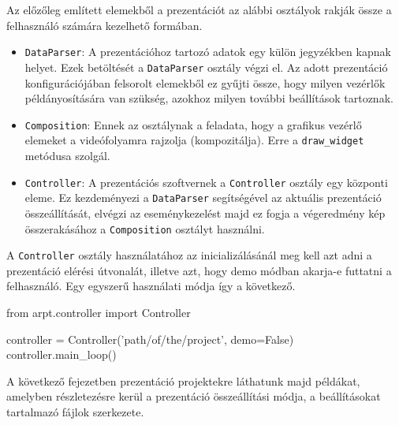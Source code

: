 
Az előzőleg említett elemekből a prezentációt az alábbi osztályok rakják össze a felhasználó számára kezelhető formában.
\begin{itemize}
\item \texttt{DataParser}: A prezentációhoz tartozó adatok egy külön jegyzékben kapnak helyet. Ezek betöltését a \texttt{DataParser} osztály végzi el. Az adott prezentáció konfigurációjában felsorolt elemekből ez gyűjti össze, hogy milyen vezérlők példányosítására van szükség, azokhoz milyen további beállítások tartoznak.
\item \texttt{Composition}: Ennek az osztálynak a feladata, hogy a grafikus vezérlő elemeket a videófolyamra rajzolja (kompozitálja). Erre a \texttt{draw\_widget} metódusa szolgál.
\item \texttt{Controller}: A prezentációs szoftvernek a \texttt{Controller} osztály egy központi eleme. Ez kezdeményezi a \texttt{DataParser} segítségével az aktuális prezentáció összeállítását, elvégzi az eseménykezelést majd ez fogja a végeredmény kép összerakásához a \texttt{Composition} osztályt használni.
\end{itemize}

A \texttt{Controller} osztály használatához az inicializálásánál meg kell azt adni a prezentáció elérési útvonalát, illetve azt, hogy demo módban akarja-e futtatni a felhasználó.
Egy egyszerű használati módja így a következő.
\begin{python}
from arpt.controller import Controller

controller = Controller('path/of/the/project', demo=False)
controller.main_loop()
\end{python}
A következő fejezetben prezentáció projektekre láthatunk majd példákat, amelyben részletezésre kerül a prezentáció összeállítási módja, a beállításokat tartalmazó fájlok szerkezete.
